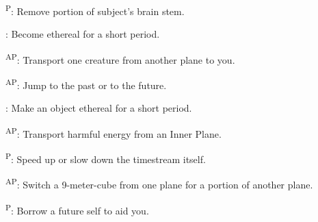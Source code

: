 \begin{enumerate*}
\item {}\textsuperscript{P}: Remove portion of subject's brain stem.

      : Become ethereal for a short period.

      \textsuperscript{AP}: Transport one creature from another plane to you.

      \textsuperscript{AP}: Jump to the past or to the future.

\item {}: Make an object ethereal for a short period.

      \textsuperscript{AP}: Transport harmful energy from an Inner Plane.

      \textsuperscript{P}: Speed up or slow down the timestream itself.

\item {}\textsuperscript{AP}: Switch a 9-meter-cube from one plane for a portion of another plane.

      \textsuperscript{P}: Borrow a future self to aid you.
\end{enumerate*}



